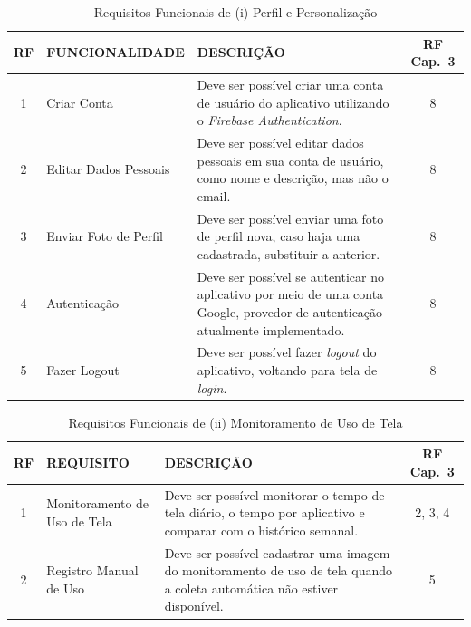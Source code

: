 \begin{table}[H]
\centering
\caption{Requisitos Funcionais de (i) Perfil e Personalização}
\begin{tabularx}{\textwidth}{|c|l|X|c|}
\hline
\rowcolor{verdeclaro}
\textbf{RF} & \textbf{FUNCIONALIDADE} & \textbf{DESCRIÇÃO} & \textbf{RF Cap.~3} \\ \hline

1 & Criar Conta &
Deve ser possível criar uma conta de usuário do aplicativo utilizando o \textit{Firebase Authentication}. & 8 \\ \hline

2 & Editar Dados Pessoais &
Deve ser possível editar dados pessoais em sua conta de usuário, como nome e descrição, mas não o email. & 8 \\ \hline

3 & Enviar Foto de Perfil &
Deve ser possível enviar uma foto de perfil nova, caso haja uma cadastrada, substituir a anterior. & 8 \\ \hline

4 & Autenticação &
Deve ser possível se autenticar no aplicativo por meio de uma conta Google, provedor de autenticação atualmente implementado. & 8 \\ \hline

5 & Fazer Logout &
Deve ser possível fazer \textit{logout} do aplicativo, voltando para tela de \textit{login}. & 8 \\ \hline

\end{tabularx}
\end{table}


\begin{table}[H]
\centering
\caption{Requisitos Funcionais de (ii) Monitoramento de Uso de Tela}
\begin{tabularx}{\textwidth}{|c|l|X|c|}
\hline
\rowcolor{verdeclaro}
\textbf{RF} & \textbf{REQUISITO} & \textbf{DESCRIÇÃO} & \textbf{RF Cap.~3} \\ \hline

1 & Monitoramento de Uso de Tela &
Deve ser possível monitorar o tempo de tela diário, o tempo por aplicativo e comparar com o histórico semanal. & 2, 3, 4 \\ \hline

2 & Registro Manual de Uso &
Deve ser possível cadastrar uma imagem do monitoramento de uso de tela quando a coleta automática não estiver disponível. & 5 \\ \hline

\end{tabularx}
\end{table}


